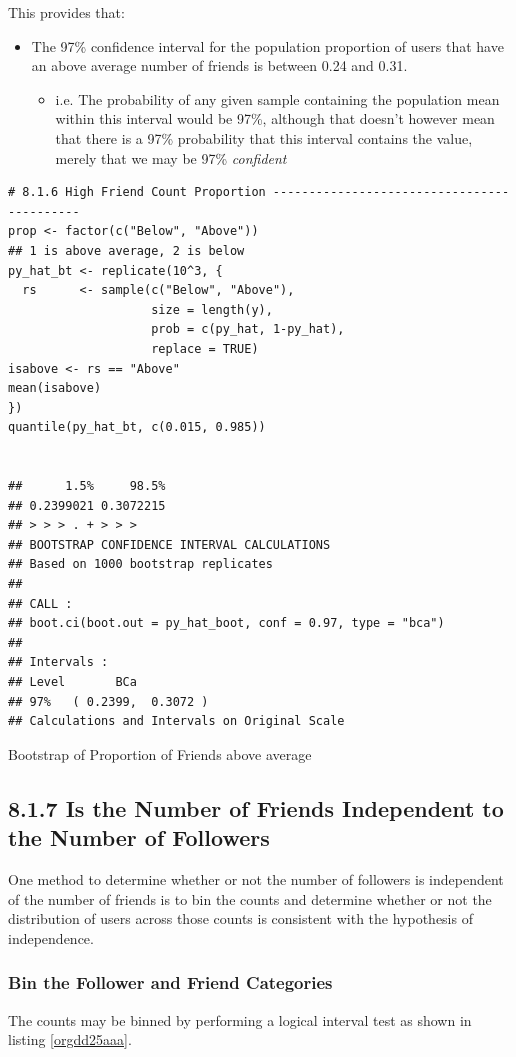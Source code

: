 \documentclass[11pt]{article}
\begin{document}
This provides that:
\begin{itemize}
\item The 97\% confidence interval for the population proportion of users that have an above average number of friends is between 0.24 and 0.31.
\begin{itemize}
\item i.e. The probability of any given sample containing the population mean within this interval would be 97\%, although  that doesn't however mean that there is a 97\% probability that this interval contains the value, merely that we may be 97\% \emph{confident}
\end{itemize}
\end{itemize}

\begin{listing}[htbp]
\begin{verbatim}
# 8.1.6 High Friend Count Proportion -------------------------------------------
prop <- factor(c("Below", "Above"))
## 1 is above average, 2 is below
py_hat_bt <- replicate(10^3, {
  rs      <- sample(c("Below", "Above"),
                    size = length(y),
                    prob = c(py_hat, 1-py_hat),
                    replace = TRUE)
isabove <- rs == "Above"
mean(isabove)
})
quantile(py_hat_bt, c(0.015, 0.985))


##      1.5%     98.5%
## 0.2399021 0.3072215
## > > > . + > > >
## BOOTSTRAP CONFIDENCE INTERVAL CALCULATIONS
## Based on 1000 bootstrap replicates
##
## CALL :
## boot.ci(boot.out = py_hat_boot, conf = 0.97, type = "bca")
##
## Intervals :
## Level       BCa
## 97%   ( 0.2399,  0.3072 )
## Calculations and Intervals on Original Scale
\end{verbatim}
\caption{\label{org132d6d2}Bootstrap of Proportion of Friends above average}
\end{listing}
\subsection{8.1.7 Is the Number of Friends Independent to the Number of Followers}
\label{sec:org511927d}
One method to determine whether or not the number of followers is independent of the number of friends is to bin the counts and determine whether or not the distribution of users across those counts is consistent with the hypothesis of independence.

\subsubsection{Bin the Follower and Friend Categories}
\label{sec:org29e7933}
The counts may be binned by performing a logical interval test as shown in listing \ref{orgdd25aaa}.
\end{document}
